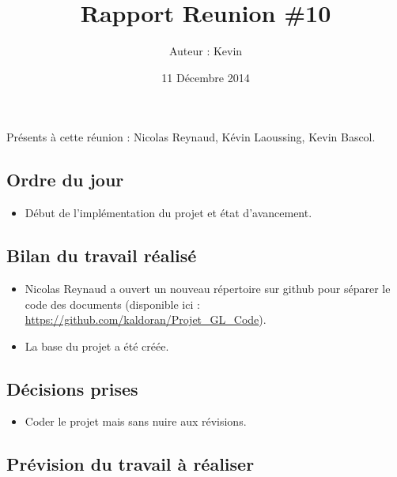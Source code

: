 \documentclass[12pt,a4paper]{article}
\title{Rapport Reunion \#10}
\author{Auteur : Kevin \bsc{BASCOL}}
\date{11 Décembre 2014}
\begin{document}
\maketitle

\newpage

Présents à cette réunion : Nicolas Reynaud, Kévin Laoussing, Kevin Bascol.

\subsection*{Ordre du jour}
\begin{itemize}[label = $\circledcirc$]
\item Début de l'implémentation du projet et état d'avancement.
\end{itemize}

\subsection*{Bilan du travail réalisé}

\begin{itemize}[label = $\circledcirc$]
\item Nicolas Reynaud a ouvert un nouveau répertoire sur github pour séparer le code des documents (disponible ici : \url{https://github.com/kaldoran/Projet_GL_Code}).

\item La base du projet a été créée.
\end{itemize}


\subsection*{Décisions prises}

\begin{itemize}[label = $\circledcirc$]
\item Coder le projet mais sans nuire aux révisions.
\end{itemize}

\subsection*{Prévision du travail à réaliser}
\end{document}
